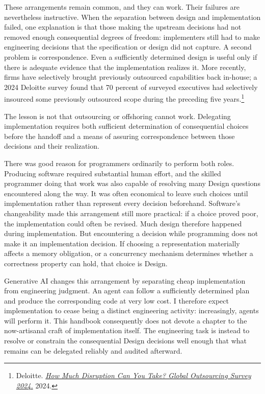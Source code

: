 These arrangements remain common, and they can work.
Their failures are nevertheless instructive.
When the separation between design and implementation failed, one explanation is that those making the upstream decisions had not removed enough consequential degrees of freedom: implementers still had to make engineering decisions that the specification or design did not capture.
A second problem is correspondence.
Even a sufficiently determined design is useful only if there is adequate evidence that the implementation realizes it.
More recently, firms have selectively brought previously outsourced capabilities back in-house; a 2024 Deloitte survey found that 70 percent of surveyed executives had selectively insourced some previously outsourced scope during the preceding five years.\footnote{Deloitte. \href{https://www.deloitte.com/us/en/services/consulting/articles/global-outsourcing-survey.html}{\emph{How Much Disruption Can You Take? Global Outsourcing Survey 2024.}} 2024.}

The lesson is not that outsourcing or offshoring cannot work.
Delegating implementation requires both sufficient determination of consequential choices before the handoff and a means of assuring correspondence between those decisions and their realization.

There was good reason for programmers ordinarily to perform both roles.
Producing software required substantial human effort, and the skilled programmer doing that work was also capable of resolving many Design questions encountered along the way.
It was often economical to leave such choices until implementation rather than represent every decision beforehand.
Software's changeability made this arrangement still more practical: if a choice proved poor, the implementation could often be revised.
Much design therefore happened during implementation.
But encountering a decision while programming does not make it an implementation decision.
If choosing a representation materially affects a memory obligation, or a concurrency mechanism determines whether a correctness property can hold, that choice is Design.

Generative AI changes this arrangement by separating cheap implementation from engineering judgment.
An agent can follow a sufficiently determined plan and produce the corresponding code at very low cost.
I therefore expect implementation to cease being a distinct engineering activity: increasingly, agents will perform it.
This handbook consequently does not devote a chapter to the now-artisanal craft of implementation itself.
The engineering task is instead to resolve or constrain the consequential Design decisions well enough that what remains can be delegated reliably and audited afterward.

